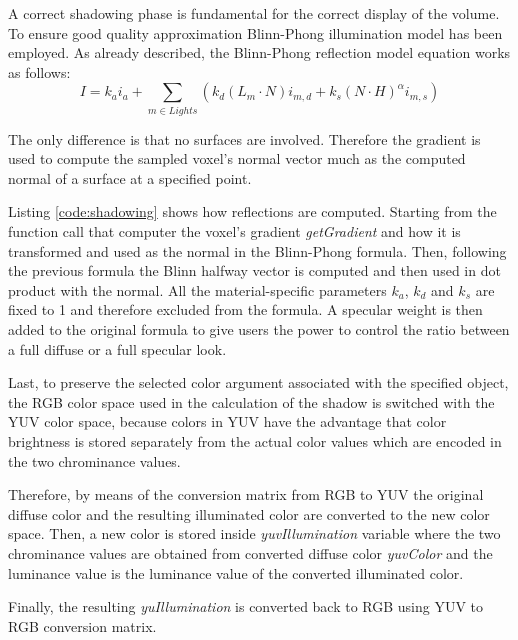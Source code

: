\documentclass[12pt,a4paper]{extarticle}
\newcommand{\linespace}{\vspace{8pt}}
\begin{document}
A correct shadowing phase is fundamental for the correct display of the volume. To ensure good quality approximation Blinn-Phong illumination model has been employed. As already described, the Blinn-Phong reflection model equation works as follows:
\[
I = k_{a} i_{a} + \sum_{m \in Lights} (k_{d}(L_{m} \cdot N)i_{m,d} +k_{s}(N \cdot H)^{\alpha}i_{m,s})
\]

The only difference is that no surfaces are involved. Therefore the gradient is used to compute the sampled voxel's normal vector much as the computed normal of a surface at a specified point.
\linespace

Listing \ref{code:shadowing} shows how reflections are computed. Starting from the function call that computer the voxel's gradient \textit{getGradient} and how it is transformed and used as the normal in the Blinn-Phong formula. Then, following the previous formula the Blinn halfway vector is computed and then used in dot product with the normal. All the material-specific parameters $k_{a}$, $k_{d}$ and $k_{s}$ are fixed to 1 and therefore excluded from the formula. A specular weight is then added to the original formula to give users the power to control the ratio between a full diffuse or a full specular look.
\linespace

Last, to preserve the selected color argument associated with the specified object, the RGB color space used in the calculation of the shadow is switched with the YUV color space, because colors in YUV have the advantage that color brightness is stored separately from the actual color values which are encoded in the two chrominance values.

Therefore, by means of the conversion matrix from RGB to YUV the original diffuse color and the resulting illuminated color are converted to the new color space. Then, a new color is stored inside \textit{yuvIllumination} variable where the two chrominance values are obtained from converted diffuse color \textit{yuvColor} and the luminance value is the luminance value of the converted illuminated color. 

Finally, the resulting \textit{yuIllumination} is converted back to RGB using YUV to RGB conversion matrix.
\end{document}
